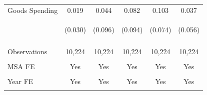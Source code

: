 \documentclass[dv_diss_main.tex]{subfiles}
\begin{document}
\begin{table}[H]
\begin{center}
\begin{tabular}{lccccc}
    Goods Spending & 0.019 & 0.044 & 0.082 & 0.103 & 0.037 \\
     & \begin{footnotesize}(0.030)\end{footnotesize} & \begin{footnotesize}(0.096)\end{footnotesize} & \begin{footnotesize}(0.094)\end{footnotesize} & \begin{footnotesize}(0.074)\end{footnotesize} & \begin{footnotesize}(0.056)\end{footnotesize} \\

    \vspace{4pt} & \begin{footnotesize}\end{footnotesize} & \begin{footnotesize}\end{footnotesize} & \begin{footnotesize}\end{footnotesize} & \begin{footnotesize}\end{footnotesize} & \begin{footnotesize}\end{footnotesize} \\
    Observations & 10,224 & 10,224 & 10,224 & 10,224 & 10,224 \\
    \vspace{-2pt} & \vspace{-2pt} & \vspace{-2pt} & \vspace{-2pt} & \vspace{-2pt} \\
    MSA FE & Yes & Yes & Yes & Yes & Yes \\
    \vspace{-2pt} & \vspace{-2pt} & \vspace{-2pt} & \vspace{-2pt} & \vspace{-2pt} \\
    Year FE & Yes & Yes & Yes & Yes & Yes \\
    \vspace{-2pt} & \vspace{-2pt} & \vspace{-2pt} & \vspace{-2pt} & \vspace{-2pt} \\

\end{tabular}
\end{center}
\end{table}
\end{document}
